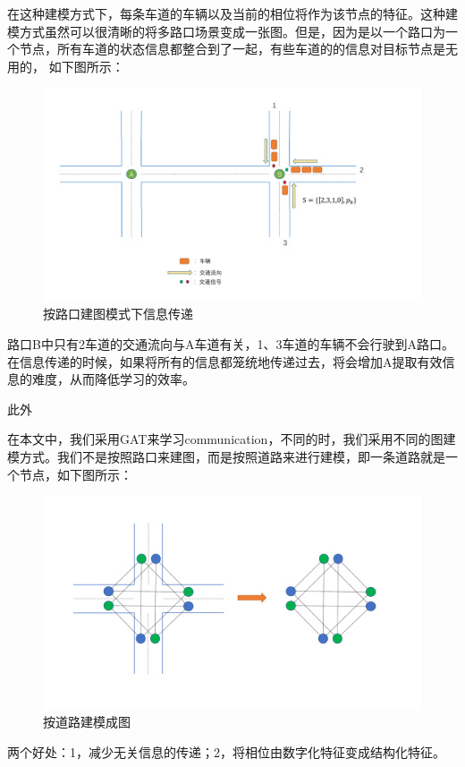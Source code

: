 在这种建模方式下，每条车道的车辆以及当前的相位将作为该节点的特征。这种建模方式虽然可以很清晰的将多路口场景变成一张图。但是，因为是以一个路口为一个节点，所有车道的状态信息都整合到了一起，有些车道的的信息对目标节点是无用的，
如下图所示：
\begin{figure}[htb]
  \includegraphics[width=12cm]{ppt/information-redundancy.pdf}
  \caption{按路口建图模式下信息传递}
  \label{fig:information-redundancy}
\end{figure}

路口B中只有2车道的交通流向与A车道有关，1、3车道的车辆不会行驶到A路口。在信息传递的时候，如果将所有的信息都笼统地传递过去，将会增加A提取有效信息的难度，从而降低学习的效率。

此外


在本文中，我们采用GAT来学习communication，不同的时，我们采用不同的图建模方式。我们不是按照路口来建图，而是按照道路来进行建模，即一条道路就是一个节点，如下图所示：
\begin{figure}[htb]
  \includegraphics[width=12cm]{ppt/graph-modeling.pdf}
  \caption{按道路建模成图}
  \label{fig:network-graph-new}
\end{figure}
两个好处：1，减少无关信息的传递；2，将相位由数字化特征变成结构化特征。

